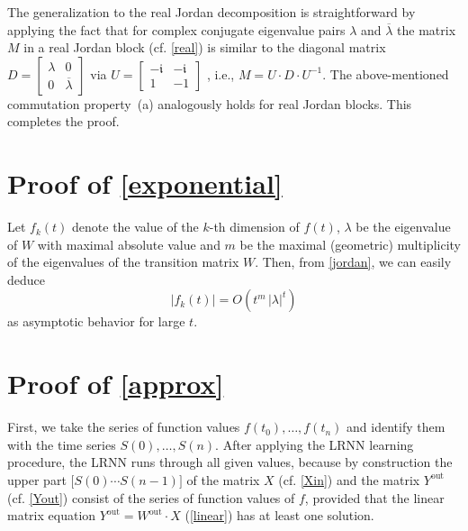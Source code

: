 \documentclass[preprint,12pt,times,authoryear]{elsarticle}%
\theoremstyle{definition}
\begin{document}
The generalization to the real Jordan decomposition is straightforward by
applying the fact that for complex conjugate eigenvalue pairs $\lambda$ and
$\overline{\lambda}$ the matrix $M$ in a real Jordan block (cf. \cref{real}) is
similar to the diagonal matrix $D = \left[ \begin{array}{cc}
	\lambda & 0\\
	0 & \overline{\lambda}
\end{array} \right]$ via $U = \left[ \begin{array}{cc}
	-\mathfrak{i} & -\mathfrak{i}\\
	1 & -1
\end{array} \right]$ \citep[Sect.~3.4.1]{HJ13}, i.e., $M = U \cdot D \cdot
U^{-1}$. The above-mentioned commutation property~(a) analogously holds for real
Jordan blocks. This completes the proof.

\section{Proof of \cref{exponential}}\label{proof:exponential}

Let $f_k(t)$ denote the value of the $k$-th dimension of $f(t)$, $\lambda$ be
the eigenvalue of $W$ with maximal absolute value and $m$ be the maximal (geometric)
multiplicity of the eigenvalues of the transition matrix $W$. Then, from
\cref{jordan}, we can easily deduce \[ |f_k(t)| = O(t^m\,|\lambda|^t) \]
as asymptotic behavior for large $t$.

\section{Proof of \cref{approx}}\label{proof:approx}

First, we take the series of function values $f(t_0),\dots,f(t_n)$ and identify
them with the time series $S(0),\dots,S(n)$. After applying the LRNN learning
procedure, the LRNN runs through all given values, because by construction the
upper part $\big[ S(0) \cdots S(n-1) \big]$ of the matrix $X$ (cf. \cref{Xin})
and the matrix $Y^\mathrm{out}$ (cf. \cref{Yout}) consist of the series of
function values of $f$, provided that the linear
matrix equation $Y^\mathrm{out} = W^\mathrm{out} \cdot X$ (\cref{linear}) has at
least one solution.
\end{document}
